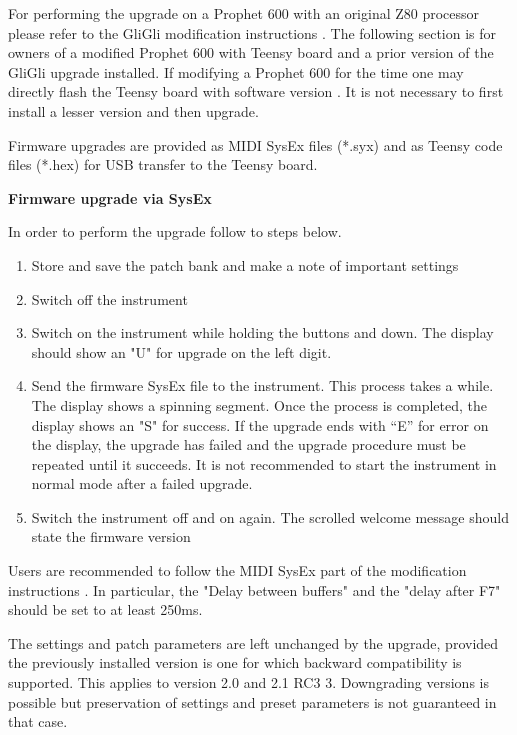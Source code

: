 For performing the upgrade on a Prophet 600 with an original Z80 processor please refer to the GliGli modification instructions \cite{modinstructions}. The following section is for owners of a modified Prophet 600 with Teensy board and a prior version of the GliGli upgrade installed. If modifying a Prophet 600 for the time one may directly flash the Teensy board with software version \version. It is not necessary to first install a lesser version and then upgrade.

Firmware upgrades are provided as MIDI SysEx files (*.syx) and as Teensy code files (*.hex) for USB transfer to the Teensy board. 

\textbf{Firmware upgrade via SysEx}

In order to perform the upgrade follow to steps below.

\begin{enumerate}
  \setlength\itemsep{0cm}
  \item Store and save the patch bank and make a note of important settings
  \item Switch off the instrument
  \item Switch on the instrument while holding the buttons \totape and \fromtape down. The display should show an "U" for upgrade on the left digit.
  \item Send the firmware SysEx file to the instrument. This process takes a while. The display shows a spinning segment. Once the process is completed, the display shows an "S" for success. If the upgrade ends with “E” for error on the display, the upgrade has failed and the upgrade procedure must be repeated until it succeeds. It is not recommended to start the instrument in normal mode after a failed upgrade.
  \item Switch the instrument off and on again. The scrolled welcome message should state the firmware version 
\end{enumerate}

Users are recommended to follow the MIDI SysEx part of the modification instructions \cite{modinstructions}. In particular, the "Delay between buffers" and the "delay after F7" should be set to at least 250ms.

The settings and patch parameters are left unchanged by the upgrade, provided the previously installed version is one for which backward compatibility is supported. This applies to version 2.0 and 2.1 RC3 3. Downgrading versions is possible but preservation of settings and preset parameters is not guaranteed in that case.

